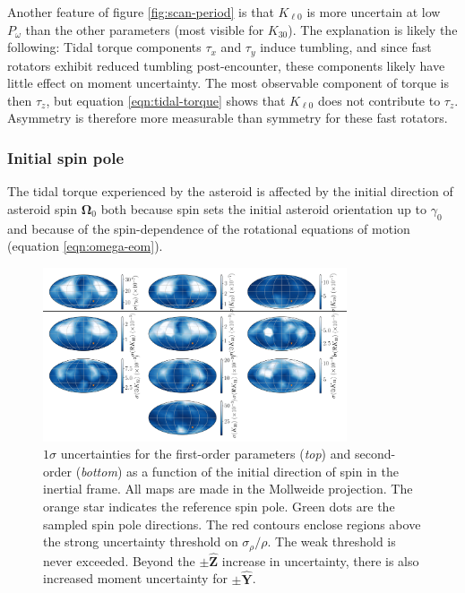 \documentclass[fleqn,usenatbib]{mnras}
\renewcommand{\unit}[1]{\bm{\hat{#1}}}
\begin{document}
Another feature of figure \ref{fig:scan-period} is that $K_{\ell 0}$ is more uncertain at low $P_\omega$ than the other parameters (most visible for $K_{30}$). The explanation is likely the following: Tidal torque components $\tau_x$ and $\tau_y$ induce tumbling, and since fast rotators exhibit reduced tumbling post-encounter, these components likely have little effect on moment uncertainty. The most observable component of torque is then $\tau_z$, but equation \ref{eqn:tidal-torque} shows that $K_{\ell 0}$ does not contribute to $\tau_z$. Asymmetry is therefore more measurable than symmetry for these fast rotators.


\subsubsection{Initial spin pole}
\label{sec:scan-spin}

The tidal torque experienced by the asteroid is affected by the initial direction of asteroid spin $\bm \Omega_0$ both because spin sets the initial asteroid orientation up to $\gamma_0$ and because of the spin-dependence of the rotational equations of motion (equation \ref{eqn:omega-eom}).

\begin{figure}
  \centering
  \includegraphics[width=0.8\textwidth]{figs/spin-pole}
  \caption{$1\sigma$ uncertainties for the first-order parameters (\textit{top}) and second-order (\textit{bottom}) as a function of the initial direction of spin in the inertial frame. All maps are made in the Mollweide projection. The orange star indicates the reference spin pole. Green dots are the sampled spin pole directions. The red contours enclose regions above the strong uncertainty threshold on $\sigma_\rho / \rho$. The weak threshold is never exceeded. Beyond the $\pm \unit Z$ increase in uncertainty, there is also increased moment uncertainty for $\pm \unit Y$.}
  \label{fig:scan-spin}
\end{figure}
\end{document}
